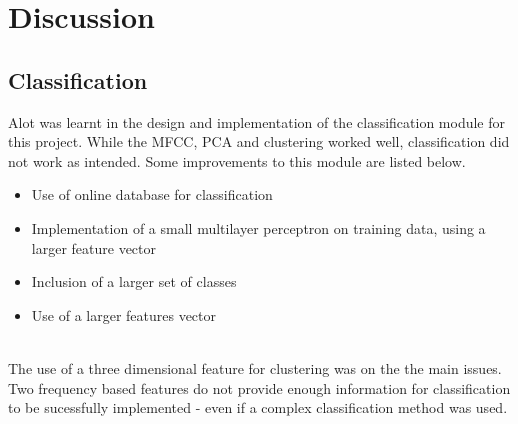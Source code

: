 \section{Discussion}

\subsection{Classification}
Alot was learnt in the design and implementation of the classification module for this project. While the MFCC, PCA and clustering worked well, classification did not work as intended. Some improvements to this module are listed below. 
\begin{itemize}
  \item Use of online database for classification
  \item Implementation of a small multilayer perceptron on training data, using a larger feature vector
  \item Inclusion of a larger set of classes
  \item Use of a larger features vector
\end{itemize}
\\
The use of a three dimensional feature for clustering was on the the main issues. Two frequency based features do not provide enough information for classification to be sucessfully implemented - even if a complex classification method was used.
